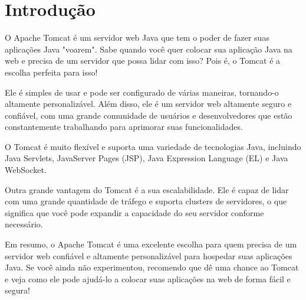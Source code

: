 \section{Introdução}

O Apache Tomcat é um servidor web Java que tem o poder de fazer suas aplicações Java "voarem". Sabe quando você quer colocar sua aplicação Java na web e precisa de um servidor que possa lidar com isso? Pois é, o Tomcat é a escolha perfeita para isso!

Ele é simples de usar e pode ser configurado de várias maneiras, tornando-o altamente personalizável. Além disso, ele é um servidor web altamente seguro e confiável, com uma grande comunidade de usuários e desenvolvedores que estão constantemente trabalhando para aprimorar suas funcionalidades.

O Tomcat é muito flexível e suporta uma variedade de tecnologias Java, incluindo Java Servlets, JavaServer Pages (JSP), Java Expression Language (EL) e Java WebSocket.

Outra grande vantagem do Tomcat é a sua escalabilidade. Ele é capaz de lidar com uma grande quantidade de tráfego e suporta clusters de servidores, o que significa que você pode expandir a capacidade do seu servidor conforme necessário.

Em resumo, o Apache Tomcat é uma excelente escolha para quem precisa de um servidor web confiável e altamente personalizável para hospedar suas aplicações Java. Se você ainda não experimentou, recomendo que dê uma chance ao Tomcat e veja como ele pode ajudá-lo a colocar suas aplicações na web de forma fácil e segura!
